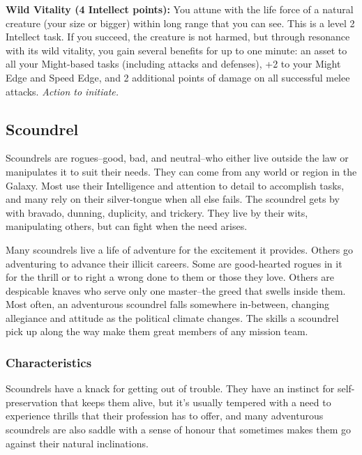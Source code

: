 \documentclass[a4paper,10pt,final,twocolumn,oneside]{book}
\newcommand{\itemAbility}[2]{\textcolor{25gray}{\textbullet\textbf{ #1:}}{ #2}\par}
\newcommand{\actionInit}{\textit{ Action to initiate.}}
\begin{document}
\itemAbility{Wild Vitality (4 Intellect points)}{You attune with the life force of a natural creature (your size or bigger) within long range that you can see. This is a level 2 Intellect task. If you succeed, the creature is not harmed, but through resonance with its wild vitality, you gain several benefits for up to one minute: an asset to all your Might-based tasks (including attacks and defenses), +2 to your Might Edge and Speed Edge, and 2 additional points of damage on all successful melee attacks.\actionInit}


%
%
%
%
%
%
%
%
%
%
%
%
%
%
%
%
%
%
%


\subsection*{Scoundrel} %
\label{sub:scoundrel}

Scoundrels are rogues--good, bad, and neutral--who either live outside the law or manipulates it to suit their needs. They can come from any world or region in the Galaxy. Most use their Intelligence and attention to detail to accomplish tasks, and many rely on their silver-tongue when all else fails. The scoundrel gets by with bravado, dunning, duplicity, and trickery. They live by their wits, manipulating others, but can fight when the need arises.

Many scoundrels live a life of adventure for the excitement it provides. Others go adventuring to advance their illicit careers. Some are good-hearted rogues in it for the thrill or to right a wrong done to them or those they love. Others are despicable knaves who serve only one master--the greed that swells inside them. Most often, an adventurous scoundrel falls somewhere in-between, changing allegiance and attitude as the political climate changes. The skills a scoundrel pick up along the way make them great members of any mission team.

\subsubsection*{Characteristics}
\label{subsub:scoundrelCharacteristics}

Scoundrels have a knack for getting out of trouble. They have an instinct for self-preservation that keeps them alive, but it's usually tempered with a need to experience thrills that their profession has to offer, and many adventurous scoundrels are also saddle with a sense of honour that sometimes makes them go against their natural inclinations.
\end{document}
